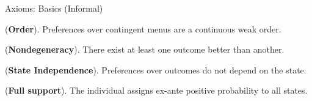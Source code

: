 \documentclass[usenames,dvipsnames,aspectratio=169,11pt]{beamer}
\begin{document}
\begin{frame}{Axioms: Basics (Informal)}\label{axiomsb1main}

	\begin{axiom}\label{ax:order}
		 (\textbf{Order}). Preferences over contingent menus are a continuous weak order. \hyperlink{axiomsb1}{}
	\end{axiom}

	\begin{axiom}\label{ax:degeneracy}

		(\textbf{Nondegeneracy}). There exist at least one outcome better than another. \hyperlink{axiomsb2}{}

	\end{axiom}

	\begin{axiom}\label{ax:sindependence}

		(\textbf{\textbf{State Independence}}). Preferences over outcomes do not depend on the state.
	\end{axiom}

	\begin{axiom}\label{ax:support}

		(\textbf{\textbf{Full support}}). The individual assigns ex-ante positive probability to all states.
	\end{axiom}

	\begin{flushright}
		\hyperlink{mainresult}{}
	\end{flushright}

\end{frame}
\end{document}
